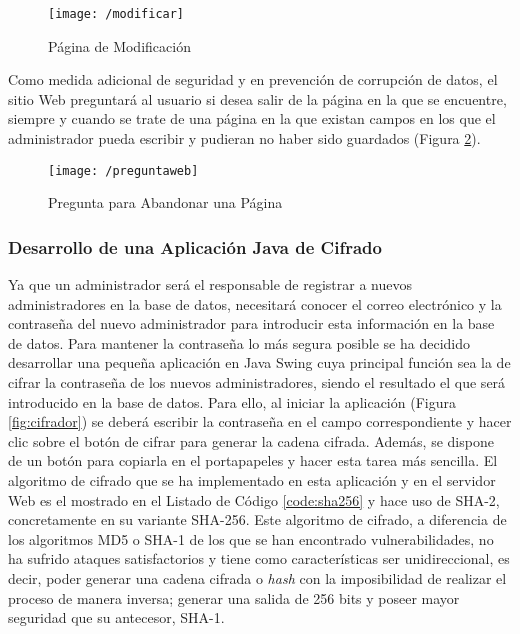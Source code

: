 \clearpage

\begin{figure}[!h]
	\begin{center}
		\texttt{[image: /modificar]}
		\caption{Página de Modificación}
		\label{fig:modificar}
	\end{center}
\end{figure}

Como medida adicional de seguridad y en prevención de corrupción de datos, el sitio Web preguntará al usuario si desea salir de la página en la que se encuentre, siempre y cuando se trate de una página en la que existan campos en los que el administrador pueda escribir y pudieran no haber sido guardados (Figura \ref{fig:preguntaweb}).

\begin{figure}[!h]
	\begin{center}
		\texttt{[image: /preguntaweb]}
		\caption{Pregunta para Abandonar una Página}
		\label{fig:preguntaweb}
	\end{center}
\end{figure}

\clearpage

\subsubsection{Desarrollo de una Aplicación Java de Cifrado}
Ya que un administrador será el responsable de registrar a nuevos administradores en la base de datos, necesitará conocer el correo electrónico y la contraseña del nuevo administrador para introducir esta información en la base de datos. Para mantener la contraseña lo más segura posible se ha decidido desarrollar una pequeña aplicación en Java Swing cuya principal función sea la de cifrar la contraseña de los nuevos administradores, siendo el resultado el que será introducido en la base de datos. Para ello, al iniciar la aplicación (Figura \ref{fig:cifrador}) se deberá escribir la contraseña en el campo correspondiente y hacer clic sobre el botón de cifrar para generar la cadena cifrada. Además, se dispone de un botón para copiarla en el portapapeles y hacer esta tarea más sencilla. El algoritmo de cifrado que se ha implementado en esta aplicación y en el servidor Web es el mostrado en el Listado de Código \ref{code:sha256} y hace uso de SHA-2, concretamente en su variante SHA-256. Este algoritmo de cifrado, a diferencia de los algoritmos MD5 o SHA-1 de los que se han encontrado vulnerabilidades, no ha sufrido ataques satisfactorios y tiene como características ser unidireccional, es decir, poder generar una cadena cifrada o \textit{hash} con la imposibilidad de realizar el proceso de manera inversa; generar una salida de 256 bits y poseer mayor seguridad que su antecesor, SHA-1.

